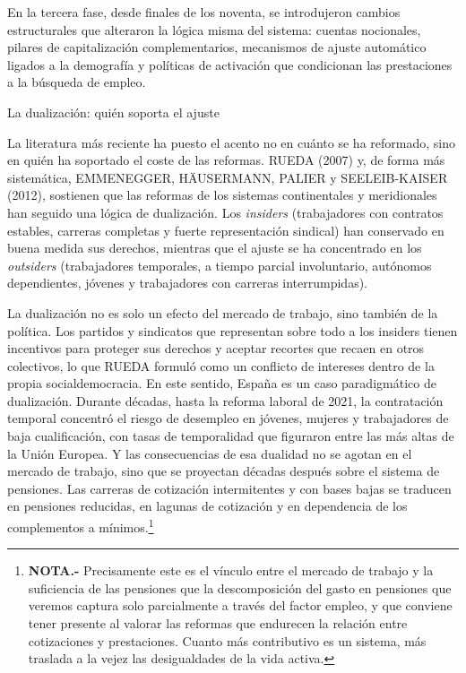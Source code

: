\documentclass[10pt,a4paper]{article}
\begin{document}
En la tercera fase, desde finales de los noventa, se introdujeron cambios estructurales que alteraron la lógica misma del sistema: cuentas nocionales, pilares de capitalización complementarios, mecanismos de ajuste automático ligados a la demografía y políticas de activación que condicionan las prestaciones a la búsqueda de empleo.



La dualización: quién soporta el ajuste

La literatura más reciente ha puesto el acento no en cuánto se ha reformado, sino en quién ha soportado el coste de las reformas. RUEDA (2007) y, de forma más sistemática, EMMENEGGER, HÄUSERMANN, PALIER y SEELEIB-KAISER (2012), sostienen que las reformas de los sistemas continentales y meridionales han seguido una lógica de dualización. Los \textit{insiders} (trabajadores con contratos estables, carreras completas y fuerte representación sindical) han conservado en buena medida sus derechos, mientras que el ajuste se ha concentrado en los \textit{outsiders} (trabajadores temporales, a tiempo parcial involuntario, autónomos dependientes, jóvenes y trabajadores con carreras interrumpidas). 

La dualización no es solo un efecto del mercado de trabajo, sino también de la política. Los partidos y sindicatos que representan sobre todo a los insiders tienen incentivos para proteger sus derechos y aceptar recortes que recaen en otros colectivos, lo que RUEDA formuló como un conflicto de intereses dentro de la propia socialdemocracia. En este sentido, España es un caso paradigmático de dualización. Durante décadas, hasta la reforma laboral de 2021, la contratación temporal concentró el riesgo de desempleo en jóvenes, mujeres y trabajadores de baja cualificación, con tasas de temporalidad que figuraron entre las más altas de la Unión Europea. Y las consecuencias de esa dualidad no se agotan en el mercado de trabajo, sino que se proyectan décadas después sobre el sistema de pensiones. Las carreras de cotización intermitentes y con bases bajas se traducen en pensiones reducidas, en lagunas de cotización y en dependencia de los complementos a mínimos.\footnote{%
    \textbf{NOTA.-} Precisamente este es el vínculo entre el mercado de trabajo y la suficiencia de las pensiones que la descomposición del gasto en pensiones que veremos captura solo parcialmente a través del factor empleo, y que conviene tener presente al valorar las reformas que endurecen la relación entre cotizaciones y prestaciones. Cuanto más contributivo es un sistema, más traslada a la vejez las desigualdades de la vida activa.
}
\end{document}
